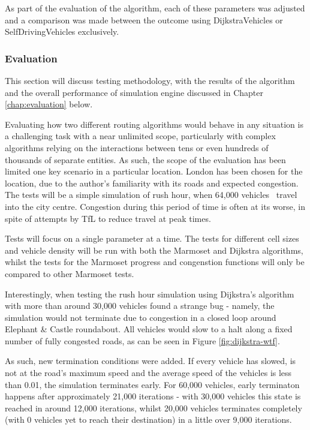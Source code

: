 \documentclass[ %
                    author={Alexander Hill},
                supervisor={Dr. Benjamin Sach},
                    degree={MEng},
                     title={MARMOSET},
                  subtitle={Multi-Agent Route Management using Online Simulation for Efficient Transportation},
                      type={research},
                      year={2016} ]{dissertation}
\begin{document}
As part of the evaluation of the algorithm, each of these parameters was
adjusted and a comparison was made between the outcome using DijkstraVehicles or
SelfDrivingVehicles exclusively.

\subsubsection{Evaluation}

This section will discuss testing methodology, with the results of the algorithm
and the overall performance of simulation engine discussed in Chapter
\ref{chap:evaluation} below.

Evaluating how two different routing algorithms would behave in any situation is
a challenging task with a near unlimited scope, particularly with complex
algorithms relying on the interactions between tens or even hundreds of
thousands of separate entities. As such, the scope of the evaluation has been
limited one key scenario in a particular location. London has been chosen for
the location, due to the author's familiarity with its roads and expected
congestion. The tests will be a simple simulation of rush hour, when 64,000
vehicles~\cite{tfl} travel into the city centre.  Congestion during this period
of time is often at its worse, in spite of attempts by TfL to reduce travel at
peak times.

Tests will focus on a single parameter at a time. The tests for different cell
sizes and vehicle density will be run with both the Marmoset and Dijkstra
algorithms, whilst the tests for the Marmoset progress and congenstion functions
will only be compared to other Marmoset tests.

Interestingly, when testing the rush hour simulation using Dijkstra's algorithm
with more than around 30,000 vehicles found a strange bug - namely, the
simulation would not terminate due to congestion in a closed loop around
Elephant \& Castle roundabout. All vehicles would slow to a halt along a fixed
number of fully congested roads, as can be seen in Figure \ref{fig:dijkstra-wtf}.

As such, new termination conditions were added. If every vehicle has slowed,
is not at the road's maximum speed and the average speed of the vehicles is less
than 0.01, the simulation terminates early. For 60,000 vehicles, early terminaton
happens after approximately 21,000 iterations - with 30,000 vehicles this state
is reached in around 12,000 iterations, whilst 20,000 vehicles terminates
completely (with 0 vehicles yet to reach their destination) in a little over
9,000 iterations.
\end{document}
